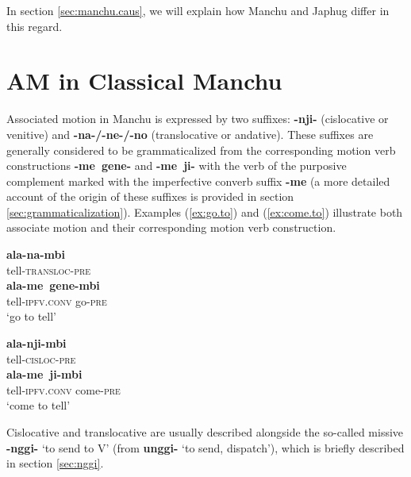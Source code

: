 \documentclass{article}
\newcommand{\ipa}[1]{\textbf{{\phon\mbox{#1}}}} %
\begin{document}
  In section \ref{sec:manchu.caus}, we will explain how Manchu and Japhug differ in this regard.
  
\section{AM in Classical Manchu} \label{sec:manchu}

Associated motion in Manchu is expressed by two suffixes: \ipa{-nji-} (cislocative or venitive) and \ipa{-na-/-ne-/-no} (translocative or andative). These suffixes are generally considered to be grammaticalized from the corresponding motion verb constructions \ipa{-me gene-} and \ipa{-me ji-} with the verb of the purposive complement marked with the imperfective converb suffix \ipa{-me} (a more detailed account of the origin of these suffixes is provided in section \ref{sec:grammaticalization}). Examples (\ref{ex:go.to}) and (\ref{ex:come.to}) illustrate both associate motion and their corresponding motion verb construction.

\begin{exe}
\ex \label{ex:go.to}
\begin{xlist}
 \label{ex:alanambi}
\gll \ipa{ala-na-mbi} \\
tell-\textsc{transloc-pre} \\
 \label{ex:alame.genembi}
\gll \ipa{ala-me gene-mbi} \\
tell-\textsc{ipfv.conv} go-\textsc{pre} \\
\glt `go to tell'
\end{xlist}
\ex \label{ex:come.to}
\begin{xlist}
 \label{ex:alanjimbi}
\gll \ipa{ala-nji-mbi} \\
tell-\textsc{cisloc-pre} \\
  \label{ex:alame.jimbi}
\gll \ipa{ala-me ji-mbi} \\
tell-\textsc{ipfv.conv} come-\textsc{pre} \\
\glt `come to tell'
\end{xlist}
\end{exe}

Cislocative and translocative are usually described alongside the so-called missive \ipa{-nggi-} ‘to send to V’ (from \ipa{unggi-} ‘to send, dispatch’), which is briefly described in section \ref{sec:nggi}.
\end{document}
